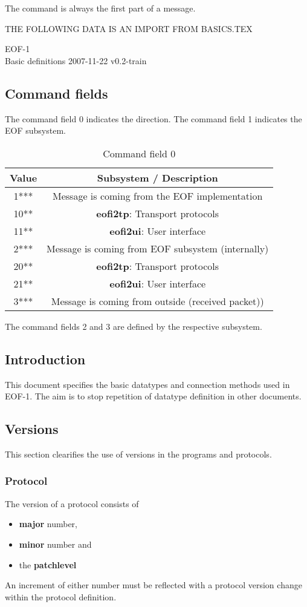 \documentclass[12pt,a4paper]{book}
\begin{document}
The command is always the first part of a message.

THE FOLLOWING DATA IS AN IMPORT FROM BASICS.TEX

EOF-1\\Basic definitions
2007-11-22 v0.2-train
\subsection{Command fields}
The command field 0 indicates the direction.
The command field 1 indicates the EOF subsystem.
\begin{longtable}{|c|c|}
\caption{Command field 0}\\
\hline
\textbf{Value} & \textbf{Subsystem} / \textbf{Description}\\
\hline
1*** & Message is coming from the EOF implementation\\
\hline
10** & \textbf{eofi2tp}: Transport protocols\\
\hline
11** & \textbf{eofi2ui}: User interface\\
\hline
2*** & Message is coming from EOF subsystem (internally)\\
\hline
20** & \textbf{eofi2tp}: Transport protocols\\
\hline
21** & \textbf{eofi2ui}: User interface\\
\hline
3*** & Message is coming from outside (received packet))\\
\hline
\end{longtable}
The command fields 2 and 3 are defined by the respective subsystem.
\subsection{Introduction}
This document specifies the basic datatypes and connection
methods used in EOF-1. The aim is to stop repetition of
datatype definition in other documents.

\subsection{Versions}
This section clearifies the use of versions in the programs and protocols.
\subsubsection{Protocol}
The version of a protocol consists of 
\begin{itemize}
\item \textbf{major} number,
\item \textbf{minor} number and
\item the \textbf{patchlevel}
\end{itemize}
An increment of either number must be reflected with a protocol version change
within the protocol definition.
\end{document}
